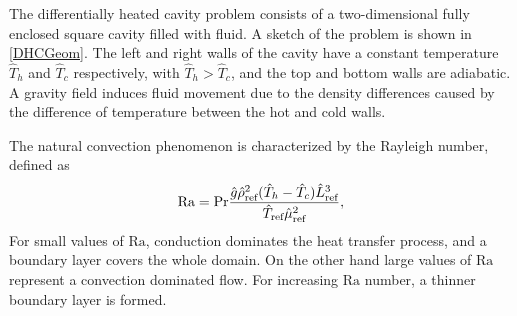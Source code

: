 The differentially heated cavity problem consists of a two-dimensional fully enclosed square cavity filled with fluid.  A sketch of the problem is shown in \cref{DHCGeom}. The left and right walls of the cavity have a constant temperature $\hat{T}_h$ and $\hat{T}_c$ respectively, with $\hat{T}_h >\hat{T}_c$, and the top and bottom walls are adiabatic. A gravity field induces fluid movement due to the density differences caused by the difference of temperature between the hot and cold walls.

The natural convection phenomenon is characterized by the Rayleigh number, defined as 
\begin{equation}\label{eq:Rayleigh}
\text{Ra} = \text{Pr} \frac{\hat g \hat \rho_{\text{ref}}^2(\hat T_h-\hat T_c) \hat L_{\text{ref}}^3}{\hat T_{\text{ref}}\hat \mu_{\text{ref}}^2},
\end{equation}
For small values of $\text{Ra}$, conduction dominates the heat transfer process, and a boundary layer covers the whole domain. On the other hand large values of $\text{Ra}$ represent a convection dominated flow. For increasing $\text{Ra}$ number, a thinner boundary layer is formed. 

